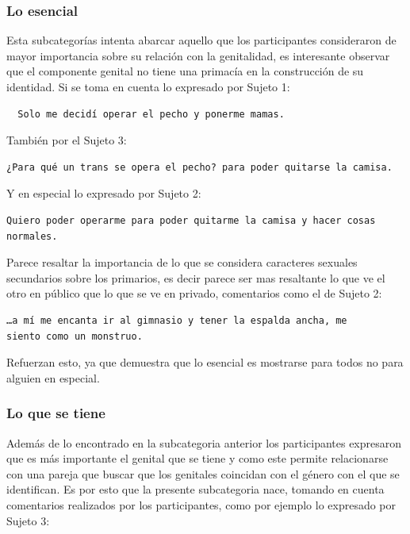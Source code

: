 \subsubsection{Lo esencial}

Esta subcategorías intenta abarcar aquello que los participantes consideraron de
mayor importancia sobre su relación con la genitalidad, es interesante observar
que el componente genital no tiene una primacía en la construcción de su
identidad. Si se toma en cuenta lo expresado por Sujeto 1:

\begin{verbatim}
  Solo me decidí operar el pecho y ponerme mamas.
\end{verbatim}

También por el Sujeto 3:

\begin{verbatim}
¿Para qué un trans se opera el pecho? para poder quitarse la camisa.
\end{verbatim}

Y en especial lo expresado por Sujeto 2:
\begin{verbatim}
Quiero poder operarme para poder quitarme la camisa y hacer cosas normales.
\end{verbatim}

Parece resaltar la importancia de lo que se considera caracteres sexuales
secundarios sobre los primarios, es decir parece ser mas resaltante lo que ve el
otro en público que lo que se ve en privado, comentarios como el de Sujeto 2:

\begin{verbatim}
…a mí me encanta ir al gimnasio y tener la espalda ancha, me
siento como un monstruo.
\end{verbatim}

Refuerzan esto, ya que demuestra que lo esencial es mostrarse para todos no para
alguien en especial.

\subsubsection{Lo que se tiene}

Además de lo encontrado en la subcategoria anterior los participantes expresaron
que es más importante el genital que se tiene y como este permite relacionarse
con una pareja que buscar que los genitales coincidan con el género con el que
se identifican. Es por esto que la presente subcategoria nace, tomando en cuenta
comentarios realizados por los participantes, como por ejemplo lo expresado por
Sujeto 3:

